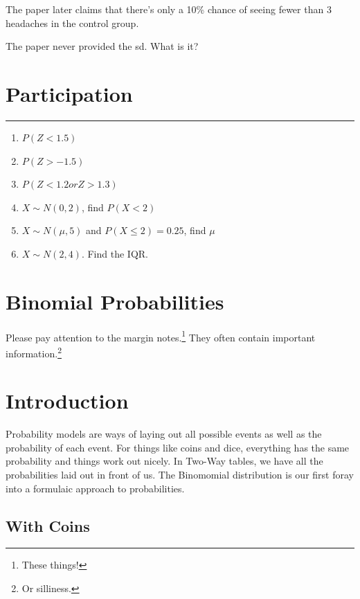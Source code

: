 \documentclass[
  letterpaper,
  DIV=11,
  numbers=noendperiod]{scrreprt}
\providecommand{\tightlist}{%
  \setlength{\itemsep}{0pt}\setlength{\parskip}{0pt}}\usepackage{longtable,booktabs,array}
\begin{document}
The paper later claims that there's only a 10\% chance of seeing fewer
than 3 headaches in the control group.

The paper never provided the sd. What is it?

\hypertarget{participation}{%
\chapter{Participation}\label{participation}}

\begin{center}\rule{0.5\linewidth}{0.5pt}\end{center}

\begin{enumerate}
\def\labelenumi{\arabic{enumi}.}
\tightlist
\item
  \(P(Z < 1.5)\)
\item
  \(P(Z > -1.5)\)
\item
  \(P(Z < 1.2 or Z > 1.3)\)
\item
  \(X\sim N(0,2)\), find \(P(X < 2)\)
\item
  \(X\sim N(\mu, 5)\) and \(P(X \le 2) = 0.25\), find \(\mu\)
\item
  \(X \sim N(2, 4)\). Find the IQR.
\end{enumerate}

\hypertarget{binomial-probabilities}{%
\chapter{Binomial Probabilities}\label{binomial-probabilities}}

Please pay attention to the margin notes.\footnote{These things!} They
often contain important information.\footnote{Or silliness.}

\hypertarget{introduction-3}{%
\chapter{Introduction}\label{introduction-3}}

Probability models are ways of laying out all possible events as well as
the probability of each event. For things like coins and dice,
everything has the same probability and things work out nicely. In
Two-Way tables, we have all the probabilities laid out in front of us.
The Binomomial distribution is our first foray into a formulaic approach
to probabilities.

\hypertarget{with-coins}{%
\section{With Coins}\label{with-coins}}
\end{document}
